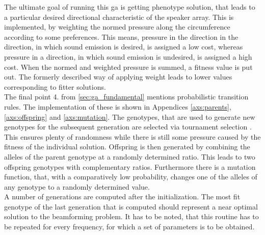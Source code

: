 The ultimate goal of running this \gls{ga} is getting phenotype solution, that leads to a particular desired directional characteristic of the speaker array. This is implemented, by weighting the normed pressure along the circumference according to some preferences. This means, pressure in the direction in the direction, in which sound emission is desired, is assigned a low cost, whereas pressure in a direction, in which sound emission is undesired, is assigned a high cost. When the normed and weighted pressure is summed, a fitness value is put out. The formerly described way of applying weight leads to lower values corresponding to fitter solutions.\\
The final point 4. from \autoref{sec:ga_fundamental} mentions probabilistic transition rules. The implementation of these is shown in Appendices \ref{axs:parents}, \ref{axs:offspring} and \ref{axs:mutation}. The genotypes, that are used to generate new genotypes for the subsequent generation are selected via tournament
selection \citep{tournament}. This ensures plenty of randomness while there is still some pressure caused by the fitness of the individual solution.
Offspring is then generated by combining the alleles of the parent genotype at a randomly determined ratio. This leads to two offspring genotypes with complementary ratios.
Furthermore there is a mutation function, that, with a comparatively low probability, changes one of the alleles of any genotype to a randomly determined value.\\
A number of generations are computed after the initialization. The most fit genotype of the last generation that is computed should represent a near optimal solution to the beamforming problem. It has to be noted, that this routine has to be repeated for every frequency, for which a set of parameters is to be obtained.



